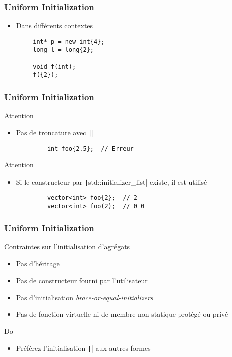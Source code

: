 \documentclass[C++.tex]{subfiles}
\begin{document}
\begin{frame}[fragile]
	\frametitle{Uniform Initialization}
	\begin{itemize}
		\item Dans différents contextes
	\end{itemize}

	\begin{verbatim}
		int* p = new int{4};
		long l = long{2};

		void f(int);
		f({2});
	\end{verbatim}
\end{frame}

\begin{frame}[fragile]
	\frametitle{Uniform Initialization}
	\begin{alertblock}{Attention}
		\begin{itemize}
			\item Pas de troncature avec \texttt|{}|
		\end{itemize}

		\begin{verbatim}
			int foo{2.5};  // Erreur
		\end{verbatim}
	\end{alertblock}

	\begin{alertblock}{Attention}
		\begin{itemize}
			\item Si le constructeur par \texttt|std::initializer_list| existe, il est utilisé
		\end{itemize}

		\begin{verbatim}
			vector<int> foo{2};  // 2
			vector<int> foo(2);  // 0 0
		\end{verbatim}
	\end{alertblock}
\end{frame}

\begin{frame}[fragile]
	\frametitle{Uniform Initialization}
	\begin{alertblock}{Contraintes sur l'initialisation d'agrégats}
		\begin{itemize}
			\item Pas d'héritage
			\item Pas de constructeur fourni par l'utilisateur
			\item Pas d'initialisation \textit{brace-or-equal-initializers}
			\item Pas de fonction virtuelle ni de membre non statique protégé ou privé
		\end{itemize}
	\end{alertblock}

	\begin{exampleblock}{Do}
		\begin{itemize}
			\item Préférez l'initialisation \texttt|{}| aux autres formes
		\end{itemize}
	\end{exampleblock}
\end{frame}
\end{document}
